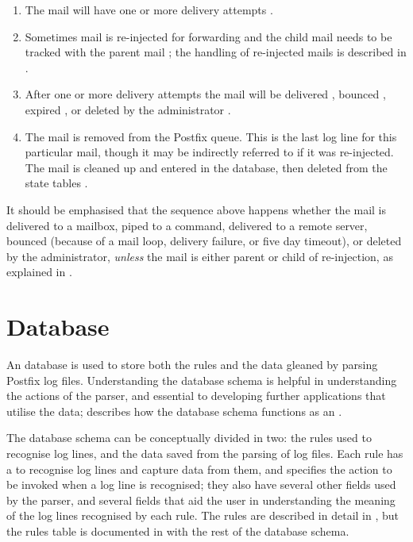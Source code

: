 \begin{enumerate}

    \item The mail will have one or more delivery attempts
        .

    \item Sometimes mail is re-injected for forwarding and the child mail
        needs to be tracked with the parent mail ; the
        handling of re-injected mails is described in .

    \item After one or more delivery attempts the mail will be delivered
        , bounced ,
        expired , or deleted by the administrator
        .

    \item The mail is removed from the Postfix queue.  This is the last log
        line for this particular mail, though it may be indirectly referred
        to if it was re-injected.  The mail is cleaned up and entered in
        the database, then deleted from the state tables
        .

\end{enumerate}

It should be emphasised that the sequence above happens whether the mail is
delivered to a mailbox, piped to a command, delivered to a remote server,
bounced (because of a mail loop, delivery failure, or five day timeout), or
deleted by the administrator, \textit{unless\/} the mail is either parent
or child of re-injection, as explained in .

\section{Database}

\label{database}

An  database is used to store both the rules and the data
gleaned by parsing Postfix log files.  Understanding the database schema is
helpful in understanding the actions of the parser, and essential to
developing further applications that utilise the data;  describes how the database schema functions as an .

The database schema can be conceptually divided in two: the rules used to
recognise log lines, and the data saved from the parsing of log files.
Each rule has a  to recognise log lines and capture data
from them, and specifies the action to be invoked when a log line is
recognised; they also have several other fields used by the parser, and
several fields that aid the user in understanding the meaning of the log
lines recognised by each rule.  The rules are described in detail in
, but the rules table is documented in
 with the rest of the database schema.

